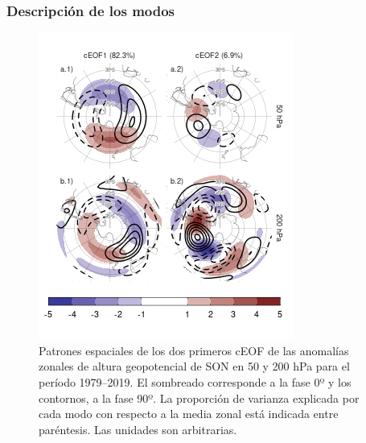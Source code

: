 \documentclass[12pt,oneside]{reedthesis}
\begin{document}
\hypertarget{descripciuxf3n-de-los-modos}{%
\subsubsection{Descripción de los modos}\label{descripciuxf3n-de-los-modos}}






\begin{figure}
\includegraphics{figures/20-ceofs/ceofs-1-1} \caption{Patrones espaciales de los dos primeros cEOF de las anomalías zonales de altura geopotencial de SON en 50 y 200 hPa para el período 1979--2019.
El sombreado corresponde a la fase 0º y los contornos, a la fase 90º.
La proporción de varianza explicada por cada modo con respecto a la media zonal está indicada entre paréntesis.
Las unidades son arbitrarias.}\label{fig:ceofs-1}
\end{figure}
\end{document}
